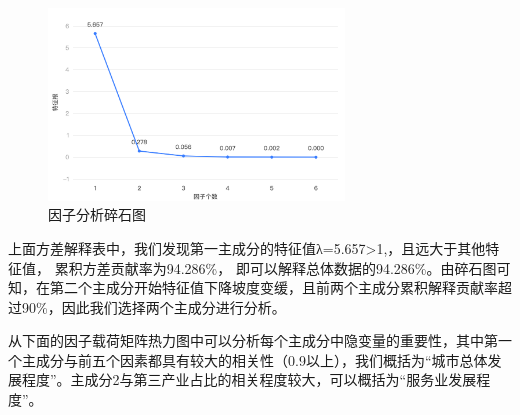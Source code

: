 \documentclass[12pt, a4paper, oneside]{ctexart}
\begin{document}
\begin{table}[H]
  \centering
  \caption{总方差解释}
  \label{tab:总方差}
\end{table}


\begin{figure}[H]
  \centering
  \includegraphics[width=0.7\textwidth]{pic/因子分析碎石图.png}
  \caption{因子分析碎石图}
  \label{fig:因子分析碎石图}
\end{figure}

上面方差解释表中，我们发现第一主成分的特征值λ=5.657\textgreater1,，且远大于其他特征值，
累积方差贡献率为94.286\%，
即可以解释总体数据的94.286\%。由碎石图可知，在第二个主成分开始特征值下降坡度变缓，且前两个主成分累积解释贡献率超过90\%，因此我们选择两个主成分进行分析。

从下面的因子载荷矩阵热力图中可以分析每个主成分中隐变量的重要性，其中第一个主成分与前五个因素都具有较大的相关性（0.9以上），我们概括为``城市总体发展程度''。主成分2与第三产业占比的相关程度较大，可以概括为``服务业发展程度''。
\end{document}
